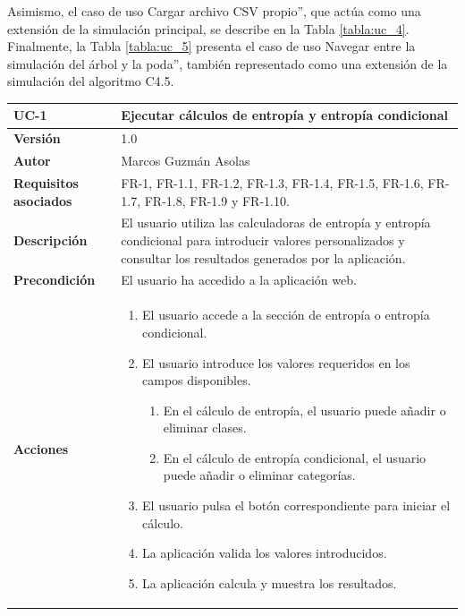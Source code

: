 Asimismo, el caso de uso Cargar archivo CSV propio'', que actúa como una extensión de la simulación principal, se describe en la Tabla \ref{tabla:uc_4}. Finalmente, la Tabla \ref{tabla:uc_5} presenta el caso de uso Navegar entre la simulación del árbol y la poda'', también representado como una extensión de la simulación del algoritmo C4.5.

\begin{table}[p]
    \centering
    \begin{tabularx}{\linewidth}{p{} p{}}
        \toprule
        \textbf{UC-1} & \textbf{Ejecutar cálculos de entropía y entropía condicional} \\
        \toprule
        \textbf{Versión} & 1.0 \\
        \textbf{Autor} & Marcos Guzmán Asolas \\
        \textbf{Requisitos asociados} & FR-1, FR-1.1, FR-1.2, FR-1.3, FR-1.4, FR-1.5, FR-1.6, FR-1.7, FR-1.8, FR-1.9 y FR-1.10. \\
        \textbf{Descripción} & El usuario utiliza las calculadoras de entropía y entropía condicional para introducir valores personalizados y consultar los resultados generados por la aplicación. \\
        \textbf{Precondición} & El usuario ha accedido a la aplicación web. \\
        \textbf{Acciones} &
        \begin{enumerate}
            \def\labelenumi{\arabic{enumi}.}
            \tightlist
            \item El usuario accede a la sección de entropía o entropía condicional.
            \item El usuario introduce los valores requeridos en los campos disponibles.
            \begin{enumerate}
                \item En el cálculo de entropía, el usuario puede añadir o eliminar clases.
                \item En el cálculo de entropía condicional, el usuario puede añadir o eliminar categorías.
            \end{enumerate}
            \item El usuario pulsa el botón correspondiente para iniciar el cálculo.
            \item La aplicación valida los valores introducidos.
            \item La aplicación calcula y muestra los resultados.

\end{enumerate}
\end{tabularx}
\end{table}
